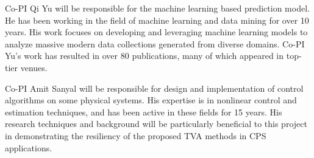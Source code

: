 \documentclass[11pt]{proposalnsf}
\newcommand{\todo}[1]{\textcolor{cyan}{\textbf{[#1]}}}
\newcommand{\dan}[1]{\textcolor{blue}{{\it [Dan says: #1]}}}
\newlength\q %
\begin{document}
\begin{sloppypar}
\vspace{3mm} \noindent Co-PI Qi Yu will be responsible for the machine learning based prediction model. He has been working in the field of machine learning and data mining for over 10 years. His work focuses on developing and leveraging machine learning models to analyze massive modern data collections generated from diverse domains. Co-PI Yu's work has resulted in over 80 publications, many of which appeared in top-tier venues. 


\vspace{3mm} \noindent Co-PI Amit Sanyal will be 
responsible for design and implementation of control algorithms on some physical systems. His expertise is in nonlinear control and estimation techniques, and has been active in these fields for 15 years. His research techniques and background will be particularly beneficial to this project in demonstrating the resiliency of the proposed TVA methods in CPS applications.  







% 





% 





\end{sloppypar}
\end{document}
